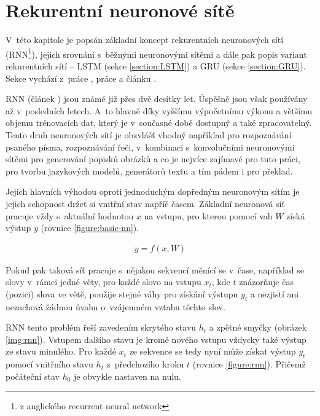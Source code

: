 \section{Rekurentní neuronové sítě}\label{section:rnn}
V~této kapitole je popsán základní koncept rekurentních neuronových sítí (RNN\footnote{z anglického recurrent neural network}), jejich srovnání s~běžnými neuronovými sítěmi a dále pak popis variant rekurentních sítí -- LSTM (sekce \ref{section:LSTM}) a GRU (sekce \ref{section:GRU}). Sekce vychází z~práce \cite{nmtThesis}, práce \cite{nmtTutorial} a článku \cite{understandingLSTM}.


RNN (článek \cite{rnn}) jsou známé již přes dvě desítky let. Úspěšně jsou však používány až v~posledních letech. A~to hlavně díky vyššímu výpočetnímu výkonu a většímu objemu trénovacích dat, který je v~současné době dostupný a také zpracovatelný. Tento druh neuronových sítí je obzvlášť vhodný například pro rozpoznávání psaného písma, rozpoznávání řeči, v~kombinaci s~konvolučními neuronovými sítěmi pro generování popisků obrázků a co je nejvíce zajímavé pro tuto práci, pro tvorbu jazykových modelů, generátorů textu a tím pádem i pro překlad.

Jejich hlavních výhodou oproti jednoduchým dopředným neuronovým sítím je jejich schopnost držet si vnitřní stav napříč časem. Základní neuronová síť pracuje vždy s~aktuální hodnotou $x$ na vstupu, pro kterou pomocí vah $W$ získá výstup $y$ (rovnice \ref{figure:basic-nn}).

\begin{align}\label{figure:basic-nn}
  y = f (x, W)
\end{align}

Pokud pak taková síť pracuje s~nějakou sekvencí měnící se v~čase, například se slovy v~rámci jedné věty, pro každé slovo na vstupu $x_t$, kde $t$ znázorňuje čas (pozici) slova ve větě, použije stejné váhy pro získání výstupu $y_t$ a nezjistí ani nezachová žádnou úvahu o~vzájemném vztahu těchto slov.

RNN tento problém řeší zavedením skrytého stavu $h_t$ a zpětné smyčky (obrázek \ref{img:rnn}). Vstupem dalšího stavu je kromě nového vstupu vždycky také výstup ze stavu minulého. Pro každé $x_t$ ze sekvence se tedy nyní může získat výstup $y_t$ pomocí vnitřního stavu $h_t$ z~předchozího kroku $t$ (rovnice \ref{figure:rnn}). Přičemž počáteční stav  $h_0$ je obvykle nastaven na nulu.



